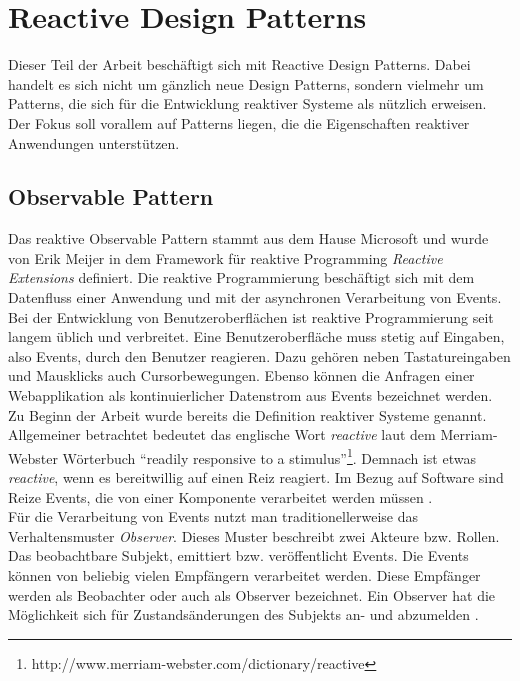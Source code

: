 \section{Reactive Design Patterns}

Dieser Teil der Arbeit beschäftigt sich mit Reactive Design Patterns. Dabei handelt es sich nicht um gänzlich neue Design Patterns, sondern vielmehr um Patterns, die sich für die Entwicklung reaktiver Systeme als nützlich erweisen. Der Fokus soll vorallem auf Patterns liegen, die die Eigenschaften reaktiver Anwendungen unterstützen.

\subsection{Observable Pattern}
Das reaktive Observable Pattern stammt aus dem Hause Microsoft und wurde von Erik Meijer in dem Framework für reaktive Programming \textit{Reactive Extensions} definiert. Die reaktive Programmierung beschäftigt sich mit dem Datenfluss einer Anwendung und mit der asynchronen Verarbeitung von Events. Bei der Entwicklung von Benutzeroberflächen ist reaktive Programmierung seit langem üblich und verbreitet. Eine Benutzeroberfläche muss stetig auf Eingaben, also Events, durch den Benutzer reagieren. Dazu gehören neben Tastatureingaben und Mausklicks auch Cursorbewegungen. Ebenso können die Anfragen einer Webapplikation als kontinuierlicher Datenstrom aus Events bezeichnet werden.\\
Zu Beginn der Arbeit wurde bereits die Definition reaktiver Systeme genannt. Allgemeiner betrachtet bedeutet das englische Wort \textit{reactive} laut dem Merriam-Webster Wörterbuch \enquote{readily responsive to a stimulus}\footnote{http://www.merriam-webster.com/dictionary/reactive}. Demnach ist etwas \textit{reactive}, wenn es bereitwillig auf einen Reiz reagiert. Im Bezug auf Software sind Reize Events, die von einer Komponente verarbeitet werden müssen \cite{rappl_introduction_2016} \cite[S.~4]{carkci_dataflow_2014} \cite[S.~5]{blackheath_functional_2015}.\\
Für die Verarbeitung von Events nutzt man traditionellerweise das Verhaltensmuster \textit{Observer}. Dieses Muster beschreibt zwei Akteure bzw. Rollen. Das beobachtbare Subjekt, emittiert bzw. veröffentlicht Events. Die Events können von beliebig vielen Empfängern verarbeitet werden. Diese Empfänger werden als Beobachter oder auch als Observer bezeichnet. Ein Observer hat die Möglichkeit sich für Zustandsänderungen des Subjekts an- und abzumelden \cite[S.~293]{gamma_design_1995}.\\
